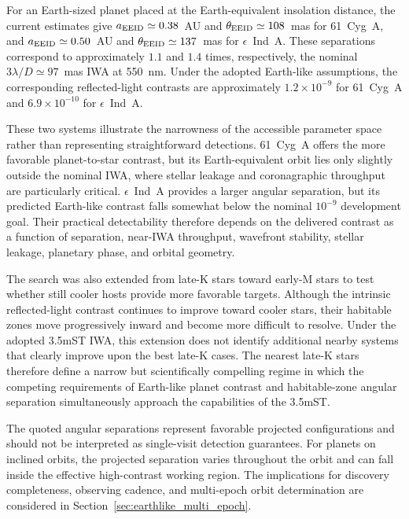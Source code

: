 For an Earth-sized planet placed at the Earth-equivalent insolation distance,
the current estimates give
$a_{\rm EEID}\simeq0.38$~AU and
$\theta_{\rm EEID}\simeq108$~mas for 61~Cyg~A, and
$a_{\rm EEID}\simeq0.50$~AU and
$\theta_{\rm EEID}\simeq137$~mas for $\epsilon$~Ind~A.
These separations correspond to approximately $1.1$ and $1.4$ times,
respectively, the nominal $3\lambda/D\simeq97$~mas IWA at 550~nm.
Under the adopted Earth-like assumptions, the corresponding reflected-light
contrasts are approximately $1.2\times10^{-9}$ for 61~Cyg~A and
$6.9\times10^{-10}$ for $\epsilon$~Ind~A.

These two systems illustrate the narrowness of the accessible parameter
space rather than representing straightforward detections. 61~Cyg~A offers
the more favorable planet-to-star contrast, but its Earth-equivalent orbit
lies only slightly outside the nominal IWA, where stellar leakage and
coronagraphic throughput are particularly critical. $\epsilon$~Ind~A
provides a larger angular separation, but its predicted Earth-like contrast
falls somewhat below the nominal $10^{-9}$ development goal. Their practical
detectability therefore depends on the delivered contrast as a function of
separation, near-IWA throughput, wavefront stability, stellar leakage,
planetary phase, and orbital geometry.

The search was also extended from late-K stars toward early-M stars to test
whether still cooler hosts provide more favorable targets. Although the
intrinsic reflected-light contrast continues to improve toward cooler stars,
their habitable zones move progressively inward and become more difficult to
resolve. Under the adopted 3.5mST IWA, this extension does not identify
additional nearby systems that clearly improve upon the best late-K cases.
The nearest late-K stars therefore define a narrow but scientifically
compelling regime in which the competing requirements of Earth-like
planet contrast and habitable-zone angular separation simultaneously
approach the capabilities of the 3.5mST.

The quoted angular separations represent favorable projected configurations
and should not be interpreted as single-visit detection guarantees.
For planets on inclined orbits, the projected separation varies throughout
the orbit and can fall inside the effective high-contrast working region.
The implications for discovery completeness, observing cadence, and
multi-epoch orbit determination are considered in
Section~\ref{sec:earthlike_multi_epoch}.

